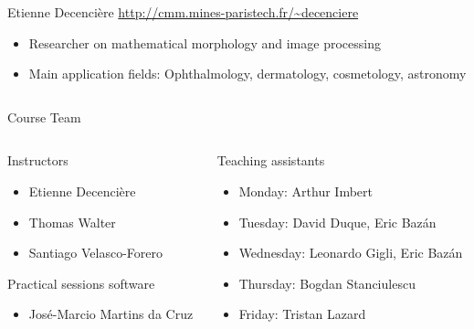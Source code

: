 \documentclass[xcolor=pdftex,dvipsnames,table,mathserif]{beamer}
\begin{document}
{\begin{columns}
\begin{column}{.8\textwidth}
    \begin{block}{Etienne Decencière \hfill \scriptsize{\url{http://cmm.mines-paristech.fr/\~decenciere}}}
      \scriptsize{
    \begin{itemize}
    \item Researcher on mathematical morphology and image processing
    \item Main application fields: Ophthalmology, dermatology, cosmetology, astronomy
    \end{itemize}
    }
  \end{block}

  \end{column}
\end{columns}



}

\begin{frame}{Course Team}

  {\scriptsize

\begin{columns}
  \begin{column}{.45\textwidth}

    \begin{block}{Instructors}
      \begin{itemize}
      \item Etienne Decencière
      \item Thomas Walter
      \item Santiago Velasco-Forero
      \end{itemize}
    \end{block}

    \begin{block}{Practical sessions software}
      \begin{itemize}
      \item José-Marcio Martins da Cruz
      \end{itemize}
    \end{block}

  \end{column}

  \begin{column}{.55\textwidth}
    \begin{block}{Teaching assistants}
      \begin{itemize}
        \item Monday: Arthur Imbert
      \item Tuesday: David Duque, Eric Baz\'an
      \item Wednesday: Leonardo Gigli, Eric Baz\'an
      \item Thursday: Bogdan Stanciulescu
      \item Friday: Tristan Lazard
      \end{itemize}
    \end{block}

  \end{column}
\end{columns}


    }

\end{frame}
\end{document}
